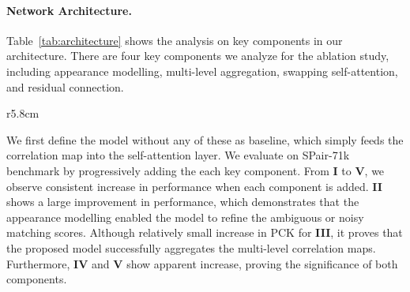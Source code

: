\paragraph{Network Architecture.}
Table~\ref{tab:architecture} shows the analysis on key components in our architecture. There are four key components we analyze for the ablation study, including appearance modelling, multi-level aggregation, swapping self-attention, and residual connection. 

\begin{wraptable}{r}{5.8cm}
\caption{\textbf{Ablation study of CATs.}}
\label{tab:architecture}\vspace{+5pt}
\centering
{}
\end{wraptable}
We first define the model without any of these as baseline, which simply feeds the correlation map into the self-attention layer. We evaluate on SPair-71k benchmark by progressively adding the each key component. From \textbf{I} to \textbf{V}, we observe consistent increase in performance when each component is added. \textbf{II} shows a large improvement in performance, which demonstrates that the appearance modelling enabled the model to refine the ambiguous or noisy matching scores. Although relatively small increase in PCK for \textbf{III}, it proves that the proposed model successfully aggregates the multi-level correlation maps. Furthermore, \textbf{IV} and \textbf{V} show apparent increase, proving the significance of both components. \vspace{-5pt}

